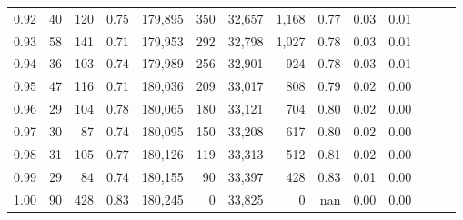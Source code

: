 \begin{tabular}{rrrrrrrrrrrrrr}
0.92 &      40 &  120 &  0.75 &  179,895 &      350 &  32,657 &   1,168 &  0.77 &  0.03 &      0.01 \\
0.93 &      58 &  141 &  0.71 &  179,953 &      292 &  32,798 &   1,027 &  0.78 &  0.03 &      0.01 \\
0.94 &      36 &  103 &  0.74 &  179,989 &      256 &  32,901 &     924 &  0.78 &  0.03 &      0.01 \\
0.95 &      47 &  116 &  0.71 &  180,036 &      209 &  33,017 &     808 &  0.79 &  0.02 &      0.00 \\
0.96 &      29 &  104 &  0.78 &  180,065 &      180 &  33,121 &     704 &  0.80 &  0.02 &      0.00 \\
0.97 &      30 &   87 &  0.74 &  180,095 &      150 &  33,208 &     617 &  0.80 &  0.02 &      0.00 \\
0.98 &      31 &  105 &  0.77 &  180,126 &      119 &  33,313 &     512 &  0.81 &  0.02 &      0.00 \\
0.99 &      29 &   84 &  0.74 &  180,155 &       90 &  33,397 &     428 &  0.83 &  0.01 &      0.00 \\
1.00 &      90 &  428 &  0.83 &  180,245 &        0 &  33,825 &       0 &   nan &  0.00 &      0.00 \\
\bottomrule
\end{tabular}
